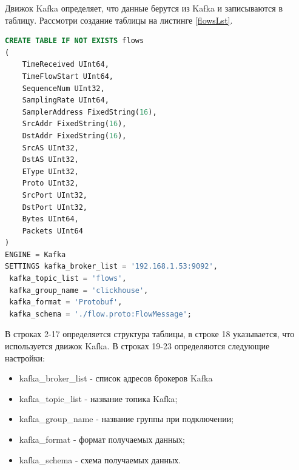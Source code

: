 Движок Kafka определяет, что данные берутся из Kafka и записываются в таблицу. Рассмотри создание таблицы на листинге \ref{flowsLst}.
\begin{lstlisting}[label={flowsLst}, language=SQL]
CREATE TABLE IF NOT EXISTS flows
(
    TimeReceived UInt64,
    TimeFlowStart UInt64,
    SequenceNum UInt32,
    SamplingRate UInt64,
    SamplerAddress FixedString(16),
    SrcAddr FixedString(16),
    DstAddr FixedString(16),
    SrcAS UInt32,
    DstAS UInt32,
    EType UInt32,
    Proto UInt32,
    SrcPort UInt32,
    DstPort UInt32,
    Bytes UInt64,
    Packets UInt64
)
ENGINE = Kafka
SETTINGS kafka_broker_list = '192.168.1.53:9092',
 kafka_topic_list = 'flows',
 kafka_group_name = 'clickhouse',
 kafka_format = 'Protobuf',
 kafka_schema = './flow.proto:FlowMessage';
\end{lstlisting}
В строках 2-17 определяется структура таблицы, в строке 18 указывается, что используется движок Kafka. В строках 19-23 определяются следующие настройки:
\begin{itemize}
\item kafka\_broker\_list - список адресов брокеров Kafka
\item kafka\_topic\_list - название топика Kafka;
\item kafka\_group\_name - название группы при подключении;
\item kafka\_format - формат получаемых данных;
\item kafka\_schema - схема получаемых данных.
\end{itemize}

